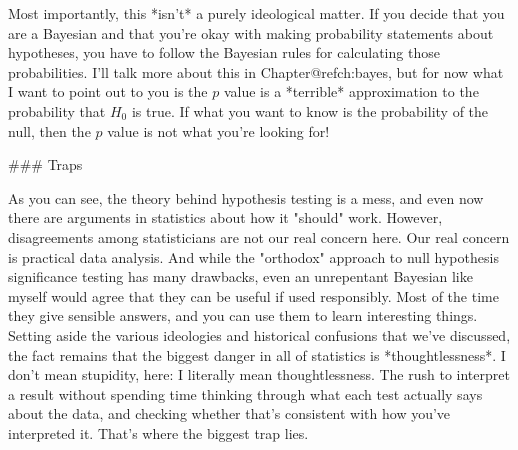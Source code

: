 Most importantly, this *isn't* a purely ideological matter. If you decide that you are a Bayesian and that you're okay with making probability statements about hypotheses, you have to follow the Bayesian rules for calculating those probabilities. I'll talk more about this in Chapter@refch:bayes, but for now what I want to point out to you is the $p$ value is a *terrible* approximation to the probability that $H_0$ is true. If what you want to know is the probability of the null, then the $p$ value is not what you're looking for!

### Traps


As you can see, the theory behind hypothesis testing is a mess, and even now there are arguments in statistics about how it "should" work. However, disagreements among statisticians are not our real concern here. Our real concern is practical data analysis. And while the "orthodox" approach to null hypothesis significance testing has many drawbacks, even an unrepentant Bayesian like myself would agree that they can be useful if used responsibly. Most of the time they give sensible answers, and you can use them to learn interesting things. Setting aside the various ideologies and historical confusions that we've discussed, the fact remains that the biggest danger in all of statistics is *thoughtlessness*. I don't mean stupidity, here: I literally mean thoughtlessness. The rush to interpret a result without spending time thinking through what each test actually says about the data, and checking whether that's consistent with how you've interpreted it. That's where the biggest trap lies. 

